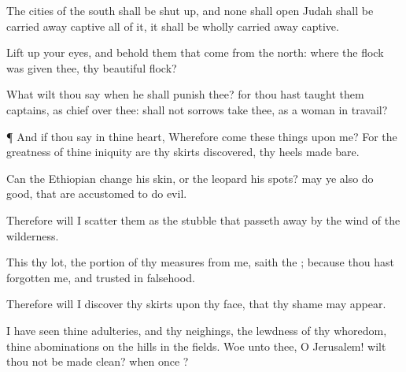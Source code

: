 {The
cities of the
south shall be shut
up, and none shall
open
{}
Judah shall be carried away
captive all of it, it shall be
wholly carried away
captive.

Lift
up your
eyes, and
behold them that
come from the
north: where
{} the
flock
{} was
given thee, thy
beautiful
flock?

What wilt thou
say when he shall
punish thee? for thou hast
taught them
{}
captains,
{} as
chief over thee: shall not
sorrows
take thee, as a
woman in
travail?


\par }{\PP {}¶ And if thou
say in thine
heart, Wherefore
come these things upon me? For the
greatness of thine
iniquity are thy
skirts
discovered,
{} thy
heels made
bare.

Can the
Ethiopian
change his
skin, or the
leopard his
spots?
{}
may ye also do
good, that are
accustomed to do
evil.

Therefore will I
scatter them as the
stubble that passeth
away by the
wind of the
wilderness.

This
{} thy
lot, the
portion of thy
measures from me,
saith the
{}; because thou hast
forgotten me, and
trusted in
falsehood.

Therefore will I
discover thy
skirts upon thy
face, that thy
shame may
appear.

I have
seen thine
adulteries, and thy
neighings, the
lewdness of thy
whoredom,
{} thine
abominations on the
hills in the
fields.
Woe unto thee, O
Jerusalem! wilt thou not be made
clean? when
{}
once
{}?




\par }
